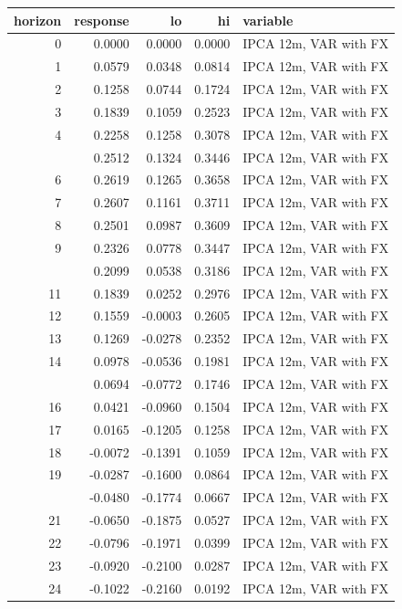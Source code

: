 
\begin{tabular}{rrrrl}
\toprule
horizon & response & lo & hi & variable\\
\midrule
0 & 0.0000 & 0.0000 & 0.0000 & IPCA 12m, VAR with FX\\
1 & 0.0579 & 0.0348 & 0.0814 & IPCA 12m, VAR with FX\\
2 & 0.1258 & 0.0744 & 0.1724 & IPCA 12m, VAR with FX\\
3 & 0.1839 & 0.1059 & 0.2523 & IPCA 12m, VAR with FX\\
4 & 0.2258 & 0.1258 & 0.3078 & IPCA 12m, VAR with FX\\
\addlinespace
5 & 0.2512 & 0.1324 & 0.3446 & IPCA 12m, VAR with FX\\
6 & 0.2619 & 0.1265 & 0.3658 & IPCA 12m, VAR with FX\\
7 & 0.2607 & 0.1161 & 0.3711 & IPCA 12m, VAR with FX\\
8 & 0.2501 & 0.0987 & 0.3609 & IPCA 12m, VAR with FX\\
9 & 0.2326 & 0.0778 & 0.3447 & IPCA 12m, VAR with FX\\
\addlinespace
10 & 0.2099 & 0.0538 & 0.3186 & IPCA 12m, VAR with FX\\
11 & 0.1839 & 0.0252 & 0.2976 & IPCA 12m, VAR with FX\\
12 & 0.1559 & -0.0003 & 0.2605 & IPCA 12m, VAR with FX\\
13 & 0.1269 & -0.0278 & 0.2352 & IPCA 12m, VAR with FX\\
14 & 0.0978 & -0.0536 & 0.1981 & IPCA 12m, VAR with FX\\
\addlinespace
15 & 0.0694 & -0.0772 & 0.1746 & IPCA 12m, VAR with FX\\
16 & 0.0421 & -0.0960 & 0.1504 & IPCA 12m, VAR with FX\\
17 & 0.0165 & -0.1205 & 0.1258 & IPCA 12m, VAR with FX\\
18 & -0.0072 & -0.1391 & 0.1059 & IPCA 12m, VAR with FX\\
19 & -0.0287 & -0.1600 & 0.0864 & IPCA 12m, VAR with FX\\
\addlinespace
20 & -0.0480 & -0.1774 & 0.0667 & IPCA 12m, VAR with FX\\
21 & -0.0650 & -0.1875 & 0.0527 & IPCA 12m, VAR with FX\\
22 & -0.0796 & -0.1971 & 0.0399 & IPCA 12m, VAR with FX\\
23 & -0.0920 & -0.2100 & 0.0287 & IPCA 12m, VAR with FX\\
24 & -0.1022 & -0.2160 & 0.0192 & IPCA 12m, VAR with FX\\

\end{tabular}

